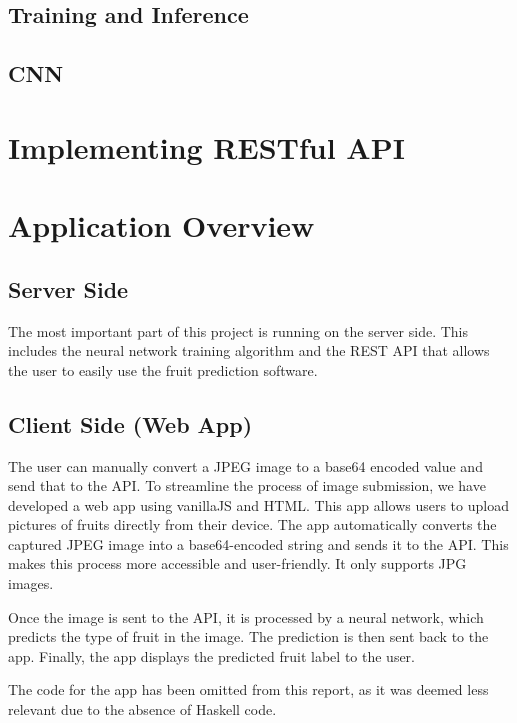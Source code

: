\documentclass[12pt,a4paper]{article}
\begin{document}
\subsection{Training and Inference}

% 


\subsection{CNN}


\section{Implementing RESTful API}



\section{Application Overview}

\subsection{Server Side}
The most important part of this project is running on the server side. This includes the neural network training algorithm and the REST API that allows the user to easily use the fruit prediction software.

\subsection{Client Side (Web App)}
The user can manually convert a JPEG image to a base64 encoded value and send that to the API.
To streamline the process of image submission, we have developed a web app using vanillaJS and HTML. This app allows users to upload pictures of fruits directly from their device. The app automatically converts the captured JPEG image into a base64-encoded string and sends it to the API. This makes this process more accessible and user-friendly. It only supports JPG images.

Once the image is sent to the API, it is processed by a neural network, which predicts the type of fruit in the image. The prediction is then sent back to the app. Finally, the app displays the predicted fruit label to the user.

The code for the app has been omitted from this report, as it was deemed less relevant due to the absence of Haskell code.



% 

% 

% 

% 

% 





\end{document}
